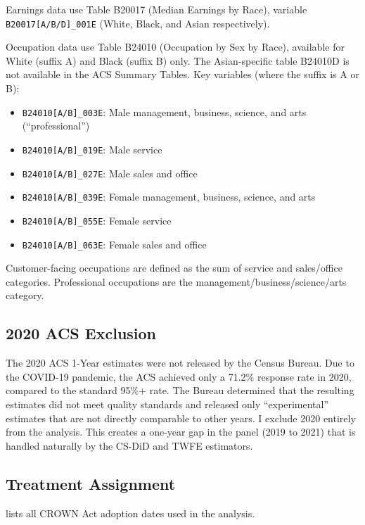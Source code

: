\documentclass[12pt]{article}
\begin{document}
Earnings data use Table B20017 (Median Earnings by Race), variable \texttt{B20017[A/B/D]\_001E} (White, Black, and Asian respectively).

Occupation data use Table B24010 (Occupation by Sex by Race), available for White (suffix A) and Black (suffix B) only. The Asian-specific table B24010D is not available in the ACS Summary Tables. Key variables (where the suffix is A or B):
\begin{itemize}
\item \texttt{B24010[A/B]\_003E}: Male management, business, science, and arts (``professional'')
\item \texttt{B24010[A/B]\_019E}: Male service
\item \texttt{B24010[A/B]\_027E}: Male sales and office
\item \texttt{B24010[A/B]\_039E}: Female management, business, science, and arts
\item \texttt{B24010[A/B]\_055E}: Female service
\item \texttt{B24010[A/B]\_063E}: Female sales and office
\end{itemize}

Customer-facing occupations are defined as the sum of service and sales/office categories. Professional occupations are the management/business/science/arts category.

\subsection{2020 ACS Exclusion}

The 2020 ACS 1-Year estimates were not released by the Census Bureau. Due to the COVID-19 pandemic, the ACS achieved only a 71.2\% response rate in 2020, compared to the standard 95\%+ rate. The Bureau determined that the resulting estimates did not meet quality standards and released only ``experimental'' estimates that are not directly comparable to other years. I exclude 2020 entirely from the analysis. This creates a one-year gap in the panel (2019 to 2021) that is handled naturally by the CS-DiD and TWFE estimators.

\subsection{Treatment Assignment}

 lists all CROWN Act adoption dates used in the analysis.


\end{document}
